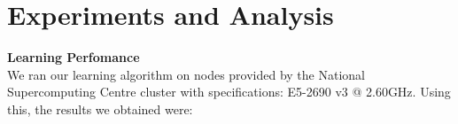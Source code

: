 \documentclass[12pt]{article}
\begin{document}



	\vspace{-0.3cm}
    \section{Experiments and Analysis}

	\textbf{Learning Perfomance}\\
	We ran our learning algorithm on nodes provided by the National Supercomputing Centre cluster
	with specifications: E5-2690 v3 @ 2.60GHz.
	Using this, the results we obtained were:
\end{document}
